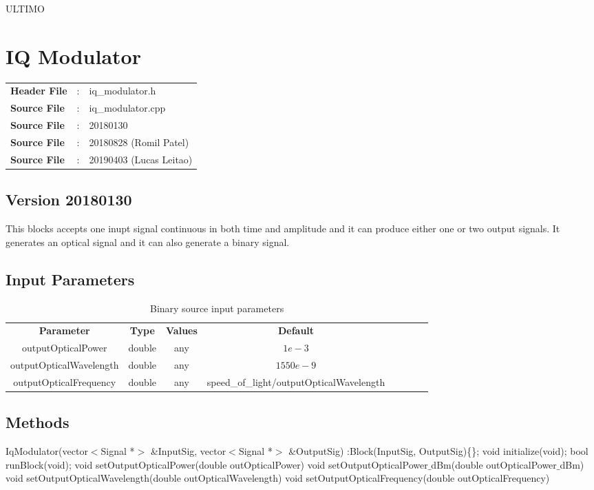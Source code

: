 ULTIMO

\clearpage

\section{IQ Modulator}
\begin{tcolorbox}	
	\begin{tabular}{p{2.75cm} p{0.2cm} p{10.5cm}} 	
		\textbf{Header File}   &:& iq\_modulator.h \\
		\textbf{Source File}   &:& iq\_modulator.cpp \\
		\textbf{Source File}   &:& 20180130 \\
		\textbf{Source File}   &:& 20180828 (Romil Patel)\\
        \textbf{Source File}   &:& 20190403 (Lucas Leitao)\\	
	\end{tabular}
\end{tcolorbox}
\subsection*{Version 20180130}
This blocks accepts one inupt signal continuous in both time and amplitude and it can produce either one or two output signals. It generates an optical signal and it can also generate a binary signal.
\subsection*{Input Parameters}
\begin{table}[h]
	\centering
	\begin{tabular}{|c|c|c|c|cccc}
		\cline{1-4}
		\textbf{Parameter} & \textbf{Type} & \textbf{Values} &   \textbf{Default}& \\ \cline{1-4}
		outputOpticalPower & double & any & $1e-3$ \\ \cline{1-4}
		outputOpticalWavelength & double & any & $1550e-9$ \\ \cline{1-4}
		outputOpticalFrequency & double & any & speed\_of\_light/outputOpticalWavelength \\ \cline{1-4}
	\end{tabular}
	\caption{Binary source input parameters}
	\label{table:iqmod_in_par}
\end{table}
\subsection*{Methods}
IqModulator(vector$<$Signal *$>$ \&InputSig, vector$<$Signal *$>$ \&OutputSig) :Block(InputSig, OutputSig)\{\};
\bigbreak
void initialize(void);
\bigbreak
bool runBlock(void);
\bigbreak
void setOutputOpticalPower(double outOpticalPower)
\bigbreak
void setOutputOpticalPower$\_$dBm(double outOpticalPower$\_$dBm)
\bigbreak
void setOutputOpticalWavelength(double outOpticalWavelength)
\bigbreak
void setOutputOpticalFrequency(double outOpticalFrequency)
